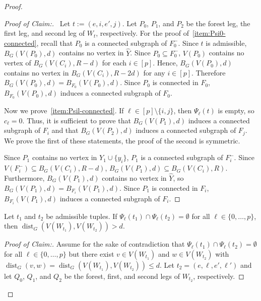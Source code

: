 \documentclass{patmorin}
\newcommand{\pat}[1]{\textcolor{Blue}{[Pat: #1]}}
\newenvironment{clmproof}{\begin{proof}[Proof of Claim:]\renewcommand{\qedsymbol}{\rule{1ex}{1ex}}}{\end{proof}}
\DeclareMathOperator{\dist}{dist}
\begin{document}
\begin{proof}
\begin{clmproof}\
    Let $t:=(e,i,e',j)$. 
    Let $P_0$, $P_1$, and $P_2$ be the forest leg, the first leg, and second leg of $W_t$, respectively.   For the proof of~\cref{item:Psi0-connected}, recall that $P_0$ is a connected subgraph of $F_0^-$. Since $t$ is admissible, $B_G(V(P_0),d)$ contains no vertex in $\widehat{Y}$. Since $P_0\subseteq F_0^-$, $V(P_0)$ contains no vertex of $B_G(V(C_i),R-d)$ for each $i\in[p]$. Hence, $B_G(V(P_0),d)$ contains no vertex in $B_G(V(C_i),R-2d)$ for any $i\in[p]$. Therefore $B_G(V(P_0),d)=B_{F_0}(V(P_0),d)$.
    Since $P_0$ is connected in $F_0$, 
    $B_{F_0}(V(P_0),d)$ induces a connected subgraph of $F_0$. 
    
    Now we prove~\cref{item:Psil-connected}. If $\ell\in [p]\setminus\{i,j\}$, then $\Psi_\ell(t)$ is empty, so $c_\ell=0$.
    Thus, it is sufficient to prove that $B_G(V(P_1), d)$ induces a connected subgraph of $F_i$ and that $B_G(V(P_2),d)$ induces a connected subgraph of $F_j$.  We prove the first of these statements, the proof of the second is symmetric.
    
    Since $P_1$ contains no vertex in $Y_1\cup\{y_i\}$, $P_1$ is a connected
    subgraph of $F_i^-$.  Since $V(F^-_i)\subseteq B_G(V(C_i),R-d)$, $B_G(V(P_1),d)\subseteq B_G(V(C_i),R)$.  Furthermore, $B_G(V(P_1),d)$ contains no vertex in $\widehat{Y}$, so $B_G(V(P_1),d)=B_{F_i}(V(P_1),d)$. 
    Since $P_1$ is connected in $F_i$, 
    $B_{F_i}(V(P_1),d)$ induces a connected subgraph of $F_i$. 
\end{clmproof}

\begin{clm}\label{w_distance}
  Let $t_1$ and $t_2$ be admissible tuples.
  If $\Psi_\ell(t_1)\cap \Psi_\ell(t_2)=\emptyset$ for all $\ell\in\{0,\ldots,p\}$, 
  then $\dist_G(V(W_{t_1}),V(W_{t_2}))> d$.  
\end{clm}



\begin{clmproof}
  Assume for the sake of contradiction that $\Psi_\ell(t_1)\cap\Psi_\ell(t_2)=\emptyset$ for all $\ell\in\{0,\ldots,p\}$ but there exist $v\in V(W_{t_1})$ and $w\in V(W_{t_2})$ with $\dist_G(v,w)=\dist_G(V(W_{t_1}),V(W_{t_2})) \le d$.  Let $t_2=(e,\ell,e',\ell')$ and let $Q_0$, $Q_1$, and $Q_2$ be the forest, first, and second legs of $W_{t_2}$, respectively.


\end{clmproof}
\end{proof}
\end{document}
